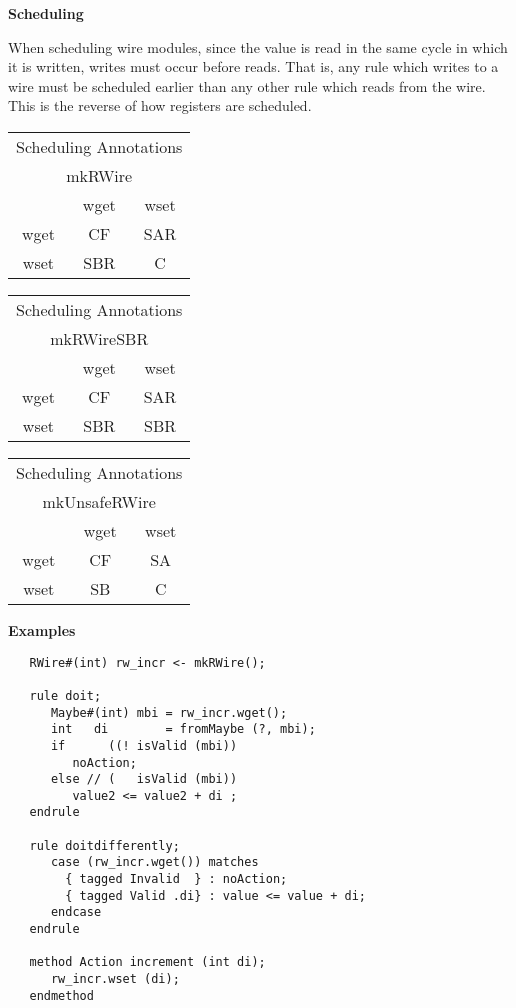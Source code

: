 {\bf Scheduling}

When scheduling wire modules, since the value is read in the same
cycle in which it is written, writes must occur before reads.  That is, any
rule which writes to a wire  must be scheduled earlier than any other
rule which reads from the 
wire.  This is the reverse of how registers are scheduled.

\begin{center}
\begin{tabular}{|c|c|c|}
\hline
\multicolumn{3}{|c|}{Scheduling Annotations}\\
\multicolumn{3}{|c|}{mkRWire}\\
\hline
&wget&wset\\
\hline
\hline
wget&CF&SAR\\
\hline
wset&SBR&C\\
\hline
\hline
\end{tabular}
\hm
\begin{tabular}{|c|c|c|}
\hline
\multicolumn{3}{|c|}{Scheduling Annotations}\\
\multicolumn{3}{|c|}{mkRWireSBR}\\
\hline
&wget&wset\\
\hline
\hline
wget&CF&SAR\\
\hline
wset&SBR&SBR\\
\hline
\hline
\end{tabular}
\hm
\begin{tabular}{|c|c|c|}
\hline
\multicolumn{3}{|c|}{Scheduling Annotations}\\
\multicolumn{3}{|c|}{mkUnsafeRWire}\\
\hline
&wget&wset\\
\hline
\hline
wget&CF&SA\\
\hline
wset&SB&C\\
\hline
\hline
\end{tabular}
\end{center}

{\bf Examples}

\begin{verbatim}
   RWire#(int) rw_incr <- mkRWire();  

   rule doit;
      Maybe#(int) mbi = rw_incr.wget();
      int   di        = fromMaybe (?, mbi);
      if      ((! isValid (mbi))
         noAction;
      else // (   isValid (mbi))
         value2 <= value2 + di ;
   endrule

   rule doitdifferently;
      case (rw_incr.wget()) matches
        { tagged Invalid  } : noAction;
        { tagged Valid .di} : value <= value + di;
      endcase
   endrule

   method Action increment (int di);
      rw_incr.wset (di);
   endmethod
\end{verbatim}


